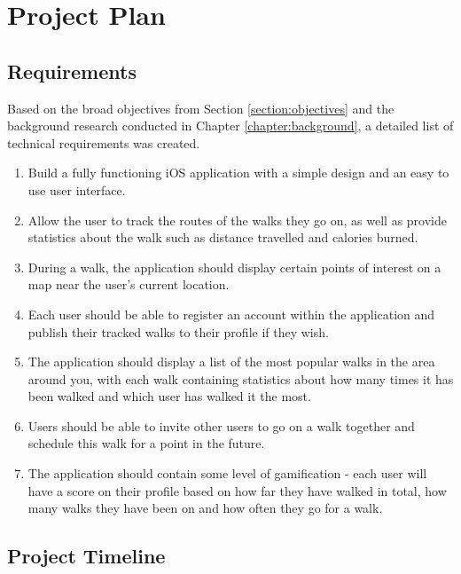 \chapter{Project Plan}

\section{Requirements} \label{section:requirements}

Based on the broad objectives from Section \ref{section:objectives} and the background research conducted in Chapter \ref{chapter:background}, a detailed list of technical requirements was created.


\begin{enumerate}[label=\textbf{Req \arabic*}]
    \item Build a fully functioning iOS application with a simple design and an easy to use user interface.
    \item Allow the user to track the routes of the walks they go on, as well as provide statistics about the walk such as distance travelled and calories burned.
    \item During a walk, the application should display certain points of interest on a map near the user's current location.
    \item Each user should be able to register an account within the application and publish their tracked walks to their profile if they wish.
    \item The application should display a list of the most popular walks in the area around you, with each walk containing statistics about how many times it has been walked and which user has walked it the most.
    \item Users should be able to invite other users to go on a walk together and schedule this walk for a point in the future.
    \item The application should contain some level of gamification - each user will have a score on their profile based on how far they have walked in total, how many walks they have been on and how often they go for a walk.
\end{enumerate}

\section{Project Timeline}


